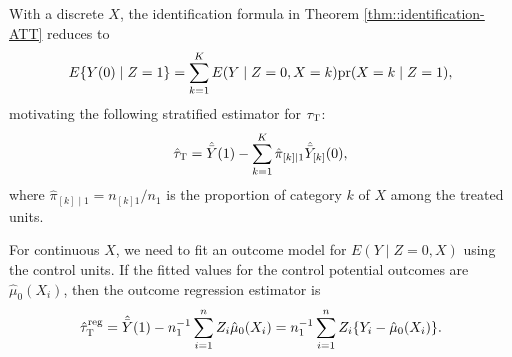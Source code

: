 With a discrete $X$, the identification formula in Theorem \ref{thm::identification-ATT} reduces to 
$$
 E\{    Y(0) \mid Z=1 \}  = \sum_{k=1}^K E(    Y \mid Z=0 , X=k) \textup{pr}(X=k \mid  Z=1  ),
$$
%
motivating the following stratified estimator for $\tau_\textsc{T} $:
$$
\hat{\tau}_\textsc{T} =   \hat{\bar{Y}}(1) - \sum_{k=1}^K \hat{\pi}_{[k]\mid 1} \hat{\bar{Y}}_{[k]}(0),
$$
where $\hat{\pi}_{[k]\mid 1} = n_{[k]1}/n_1$ is the proportion of category $k$ of $X$ among the treated units. 


For continuous $X$, we need to fit an outcome model for $E(Y\mid Z=0, X)$ using the control units. If the fitted values for the control potential outcomes are $\hat{\mu}_0(X_i)$, then the outcome regression estimator is
$$
\hat{\tau}_\textsc{T}^\text{reg} =  \hat{\bar{Y}}(1) - n_1^{-1} \sum_{i=1}^n Z_i \hat{\mu}_0(X_i) = n_1^{-1} \sum_{i=1}^n Z_i  \{  Y_i - \hat{\mu}_0(X_i)  \}. 
$$



